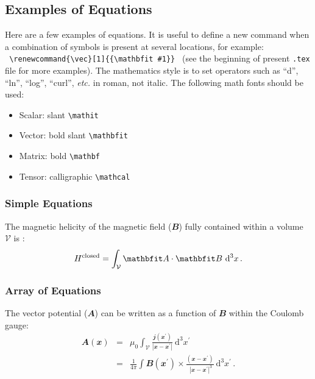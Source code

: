 \documentclass[namedreferences,hyperref,optionalrh]{spr-sola}
\renewcommand{\vec}[1]{{\mathbfit #1}}
\newcommand{\vol}{{\mathcal V}}
\newcommand{\dv}{~{\mathrm d}^3 x}
\newcommand{\intv}{\int_{\vol}^{}}
\newcommand{\avec}{\vec A}
\newcommand{\bb}{\vec B}
\newcommand{\jj}{\vec j}
\newcommand{\xx}{\vec x}
\begin{document}
\subsection{Examples of Equations} %
\label{S-equations}
Here are a few examples of equations. It is useful to define
a new command when a combination of symbols is present at several 
locations, for example:\\
  \verb+ \renewcommand{\vec}[1]{{\mathbfit #1}} + 
(see the beginning of present \texttt{.tex} file for more examples). 
The mathematics style is to set operators such as ``d'', ``ln'', ``log'', 
``curl'', \textit{etc.} in roman, not italic.
The following math fonts should be used:
\begin{itemize}
\item Scalar: slant \verb+\mathit+
\item Vector: bold slant \verb+\mathbfit+
\item Matrix: bold \verb+\mathbf+
\item Tensor: calligraphic \verb+\mathcal+
\end{itemize}
  
\subsubsection{Simple Equations} %
\label{S-simple-equations}
The magnetic helicity of the magnetic field ($\vec{B}$) fully contained 
within a volume $\vol $ is \citep{Elsasser56}:
\begin{equation}  \label{Eq-H-def}
 H^{\rm closed} = \intv \avec \cdot \bb \dv \,.
\end{equation}

\subsubsection{Array of Equations} %
\label{S-array-equations}
The vector potential ($\avec$) can be written as a function of $\bb$
within the Coulomb gauge:
\begin{eqnarray}   
 \avec (\xx) &=& \mu_{0}\intv \frac{\jj (\xx  ^\prime)}
                 { | \xx - \xx  ^\prime |} \dv ^\prime          
                   \nonumber \\      %
             &=& \frac{1}{4\pi} \int \bb (\xx ^\prime ) \times
                 \frac{(\xx  - \xx ^\prime)}{\,\, |\xx - \xx ^\prime |^3}  
                                       \dv ^\prime   \,. 
                   \label{Eq-A-B}    %
\end{eqnarray}
\end{document}
